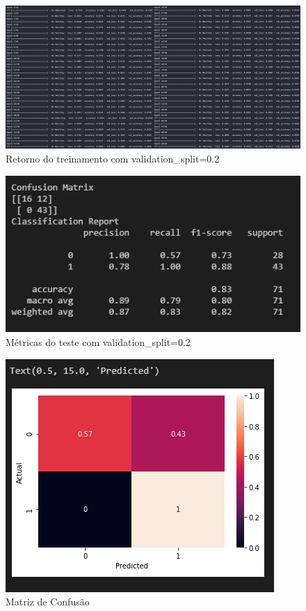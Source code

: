 \documentclass[12pt]{article}
\begin{document}
\begin{figure}[H]
	\centering
	\includegraphics[width=1.1\linewidth]{Imagens/validacao/fitvalidacao}
	\caption{Retorno do treinamento com validation\_split=0.2}
	\label{fig:fitvalidacao}
\end{figure}
\begin{figure}[H]
	\centering
	\includegraphics[width=0.7\linewidth]{Imagens/validacao/metricasvalidacao}
	\caption{Métricas do teste com validation\_split=0.2}
	\label{fig:metricasvalidacao}
\end{figure}
\begin{figure}[H]
	\centering
	\includegraphics[width=0.7\linewidth]{Imagens/validacao/confusaovalidacao}
	\caption{Matriz de Confusão}
	\label{fig:confusaovalidacao}
\end{figure}
 
\end{document}
